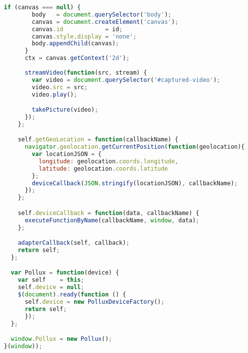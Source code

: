 \begin{lstlisting}[language=JavaScript]
      if (canvas === null) {
        body   = document.querySelector('body');
        canvas = document.createElement('canvas');
        canvas.id            = id;
        canvas.style.display = 'none';
        body.appendChild(canvas);
      }
      ctx = canvas.getContext('2d');
      
      streamVideo(function(src, stream) {
        var video = document.querySelector('#captured-video');
        video.src = src;
        video.play();

        takePicture(video);
      });
    };

    self.getGeoLocation = function(callbackName) {
      navigator.geolocation.getCurrentPosition(function(geolocation){
        var locationJSON = {
          longitude: geolocation.coords.longitude,
          latitude: geolocation.coords.latitude
        };
        deviceCallback(JSON.stringify(locationJSON), callbackName);
      });
    };

    self.deviceCallback = function(data, callbackName) {
      executeFunctionByName(callbackName, window, data);
    };

    adapterCallback(self, callback);
    return self;
  };

  var Pollux = function(device) {
    var self    = this;
    self.device = null;
    $(document).ready(function () {  
      self.device = new PolluxDeviceFactory();
      return self;
      });
  };

  window.Pollux = new Pollux();
}(window));
\end{lstlisting}

\newpage

